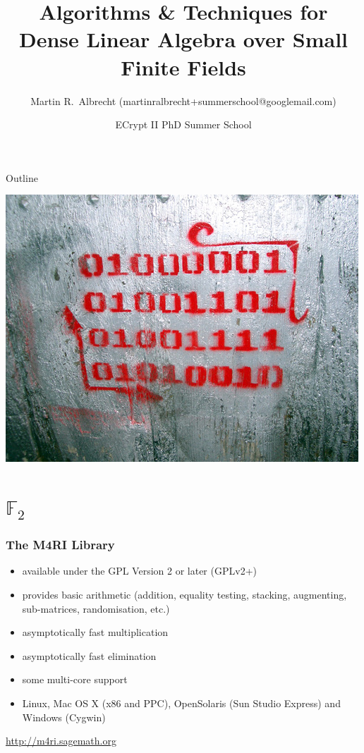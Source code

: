 \documentclass[11pt]{beamer}
\title{Algorithms \& Techniques for Dense Linear Algebra over Small Finite Fields}
\author{Martin R.\ Albrecht (martinralbrecht+summerschool@googlemail.com)}
\institute{POLSYS Team, UPMC, Paris, France}
\date{ECrypt II PhD Summer School}
\newcommand{\field}[1]{\mathbb{#1}}
\newcommand{\F}{\ensuremath{\field{F}}\xspace}
\begin{document}
\begin{frame}
\titlepage
\end{frame}

\begin{frame}{Outline}
\tableofcontents
\begin{flushright}
\includegraphics[height=0.2\textwidth]{gf2.jpg}
\end{flushright}
\end{frame}

\section{\texorpdfstring{$\F_2$}{F2}}

\begin{frame}
\frametitle{The M4RI Library}
\begin{itemize}
\item available under the GPL Version 2 or later (GPLv2+)
\item provides basic arithmetic (addition, equality testing, stacking, augmenting, sub-matrices, randomisation, etc.)
\item asymptotically fast multiplication
\item asymptotically fast elimination
\item some multi-core support
\item Linux, Mac OS X (x86 and PPC), OpenSolaris (Sun Studio Express) and Windows (Cygwin)
\end{itemize}

\begin{block}{}
\centering
\url{http://m4ri.sagemath.org} 
\end{block}
\end{frame}
\end{document}
